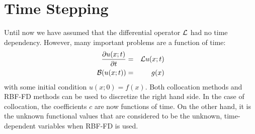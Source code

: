 \documentclass{report}
\begin{document}
{%





\section{Time Stepping}

Until now we have assumed that the differential operator $\mathcal{L}$ had no time dependency. However, many important problems are a function of time: 
\begin{eqnarray}
\frac{\partial u(x;t)}{\partial t} &=& \mathcal{L}u(x;t) \\
\mathcal{B}(u(x;t)) &=& g(x) 
\label{eqn:timedep}
\end{eqnarray}
with some initial condition $u(x;0) = f(x)$. Both collocation methods and RBF-FD methods can be used to discretize the right hand side. In the case of collocation, the coefficients $c$ are now functions of time. On the other hand, it is the unknown functional values that are considered to be the unknown, time-dependent variables when RBF-FD is used. 	

}
\end{document}
